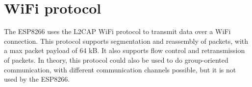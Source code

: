 \documentclass[11pt]{article}
\begin{document}
\section{WiFi protocol}
The ESP8266 uses the L2CAP WiFi protocol to transmit data over a WiFi connection. This protocol supports segmentation and reassembly of packets, with a max packet payload of 64 kB. It also supports flow control and retransmission of packets. In theory, this protocol could also be used to do group-oriented communication, with different communication channels possible, but it is not used by the ESP8266.

\newpage
\begin{appendices}



\end{appendices}
\end{document}
